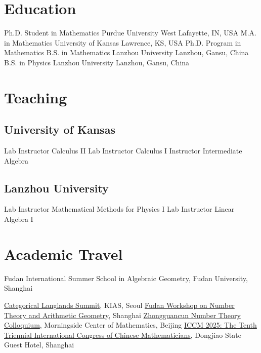 \documentclass[11pt,letterpaper,sans]{moderncv}
\begin{document}
\makecvtitle

\section{Education}
  {Ph.D. Student in Mathematics}
  {Purdue University}
  {West Lafayette, IN, USA}
  {}{}
  {M.A. in Mathematics}
  {University of Kansas}
  {Lawrence, KS, USA}
  {}
  {Ph.D. Program in Mathematics}
  {B.S. in Mathematics}
  {Lanzhou University}
  {Lanzhou, Gansu, China}
  {}{}
  {B.S. in Physics}
  {Lanzhou University}
  {Lanzhou, Gansu, China}
  {}{}

\section{Teaching}
\subsection{University of Kansas}
  {Lab Instructor}
  {Calculus II}{}{}{}
  {Lab Instructor}
  {Calculus I}{}{}{}
  {Instructor}
  {Intermediate Algebra}{}{}{}

\subsection{Lanzhou University}
  {Lab Instructor}
  {Mathematical Methods for Physics I}{}{}{}
  {Lab Instructor}
  {Linear Algebra I}{}{}{}

\section{Academic Travel}
\cvitem{\textcolor{color1}{Upcoming}}{}
  {Fudan International Summer School in Algebraic Geometry, Fudan University, Shanghai}

\cvitem{\textcolor{color1}{2026}}{}
  {\href{http://www.davidrenshawhansen.net/2026KIASsummerschool.html}{Categorical Langlands Summit}, KIAS, Seoul}
  {\href{https://www.fudan-nt.cn/events/2026-06-06-workshop.html}{Fudan Workshop on Number Theory and Arithmetic Geometry}, Shanghai}
  {\href{https://ymsc.tsinghua.edu.cn/info/1060/3911.htm}{Zhongguancun Number Theory Colloquium}, Morningside Center of Mathematics, Beijing}
  {\href{https://iccm.simis.cn/iccm2025/}{ICCM 2025: The Tenth Triennial International Congress of Chinese Mathematicians}, Dongjiao State Guest Hotel, Shanghai}
\end{document}
